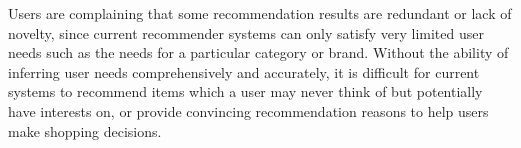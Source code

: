Users are complaining that some recommendation results are redundant 
or lack of novelty, %
since current recommender systems can only satisfy very limited user needs 
such as the needs for a particular category or brand.
Without the ability of inferring user needs comprehensively and accurately, 
it is difficult for current systems to recommend items which a user 
may never think of but potentially have interests on, or provide convincing 
recommendation reasons to help users make shopping decisions. 

